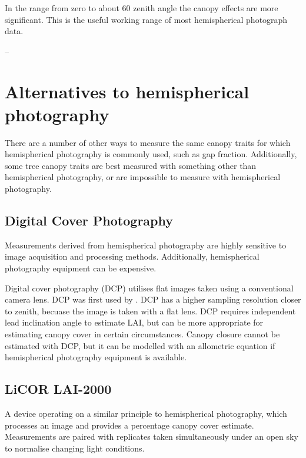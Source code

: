 \documentclass{article}
\begin{document}
\begin{minipage}{\linewidth}
\begin{framed}
In the range from zero to about 60 zenith angle the canopy effects are more significant. This is the useful working range of most hemispherical photograph data.

-- \citet{Jupp2009}
\end{framed}
\end{minipage}

\section{Alternatives to hemispherical photography}

There are a number of other ways to measure the same canopy traits for which hemispherical photography is commonly used, such as gap fraction. Additionally, some tree canopy traits are best measured with something other than hemispherical photography, or are impossible to measure with hemispherical photography.

\subsection{Digital Cover Photography}

Measurements derived from hemispherical photography are highly sensitive to image acquisition and processing methods. Additionally, hemispherical photography equipment can be expensive.

Digital cover photography (DCP) utilises flat images taken using a conventional camera lens. DCP was first used by \citet{Macfarlane2007a, Macfarlane2007b, Macfarlane2007c}. DCP has a higher sampling resolution closer to zenith, becuase the image is taken with a flat lens. DCP requires independent lead inclination angle to estimate LAI, but can be more appropriate for estimating canopy cover in certain circumstances. Canopy closure cannot be estimated with DCP, but it can be modelled with an allometric equation if hemispherical photography equipment is available.

\subsection{LiCOR LAI-2000}

A device operating on a similar principle to hemispherical photography, which processes an image and provides a percentage canopy cover estimate. Measurements are paired with replicates taken simultaneously under an open sky to normalise changing light conditions.
\end{document}

